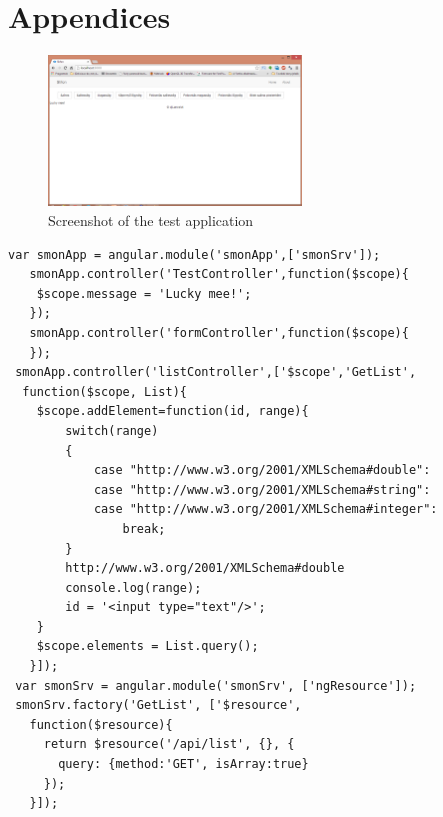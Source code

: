 \appendix
\chapter*{Appendices}
\setcounter{chapter}{6}  %
\setcounter{equation}{0} %

\vspace{-30px}
 \begin{figure}[h]
 \centering
 \includegraphics[width=0.6\textwidth]{figures/smon_ss.png}
 \caption{Screenshot of the test application\label{fig:smonss}}
 \end{figure}
 \begin{lstlisting}[caption={Client side JavaScript of test application\label{fig:cont}}]
 var smonApp = angular.module('smonApp',['smonSrv']);
   smonApp.controller('TestController',function($scope){
 	$scope.message = 'Lucky mee!';
   });
   smonApp.controller('formController',function($scope){
   });
 smonApp.controller('listController',['$scope','GetList',
  function($scope, List){
  	$scope.addElement=function(id, range){
  		switch(range)
  		{
  			case "http://www.w3.org/2001/XMLSchema#double":
  			case "http://www.w3.org/2001/XMLSchema#string":
  			case "http://www.w3.org/2001/XMLSchema#integer":
  				break;
  		}
  		http://www.w3.org/2001/XMLSchema#double
     	console.log(range);
     	id = '<input type="text"/>';
 	}
  	$scope.elements = List.query();
   }]);
 var smonSrv = angular.module('smonSrv', ['ngResource']);
 smonSrv.factory('GetList', ['$resource',
   function($resource){
     return $resource('/api/list', {}, {
       query: {method:'GET', isArray:true}
     });
   }]);
 
     \end{lstlisting}
